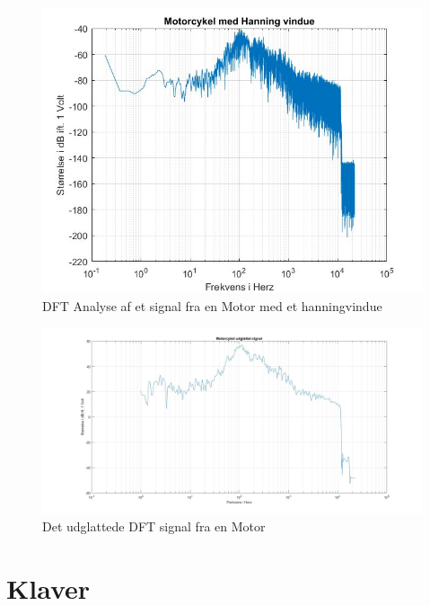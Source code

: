 \begin{figure}[H]
	\centering
	\includegraphics[width=180mm]{figures/Motor/hanning.jpg}
	\caption{DFT Analyse af et signal fra en Motor med et hanningvindue}
	\label{fig:Motor hanning}
\end{figure}

\begin{figure}[H]
	\centering
	\includegraphics[width=180mm]{figures/Motor/udglattet.jpg}
	\caption{Det udglattede DFT signal fra en Motor}
	\label{fig:Motor udglattet}
\end{figure}

\section{Klaver}

